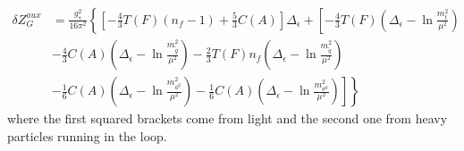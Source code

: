 \begin{align}
\delta Z^{aux}_G &= \frac{g_s^2}{16\pi^2} \left\{\left[-\frac{4}{3}T(F)(n_f-1) + \frac{5}{3} C(A) \right] \Delta_\epsilon + \left[ - \frac{4}{3}T(F) \left( \Delta_\epsilon - \ln \frac{m_t^2}{\mu^2} \right)  \right.\right.\nonumber\\
&- \frac{4}{3} C(A) \left( \Delta_\epsilon - \ln \frac{m_{\tilde{g}}^2}{\mu^2} \right) -\frac{2}{3}T(F) n_f \left( \Delta_\epsilon - \ln \frac{m_{\tilde{q}}^2}{\mu^2} \right)\nonumber\\
& - \frac{1}{6} C(A) \left( \Delta_\epsilon - \ln \frac{m_{\phi^0}^2}{\mu^2} \right) - \frac{1}{6} C(A) \left.\left.\left( \Delta_\epsilon - \ln \frac{m_{\sigma^0}^2}{\mu^2} \right)\right]\right\}
\end{align}
where the first squared brackets come from light and the second one from heavy particles running in the loop.



